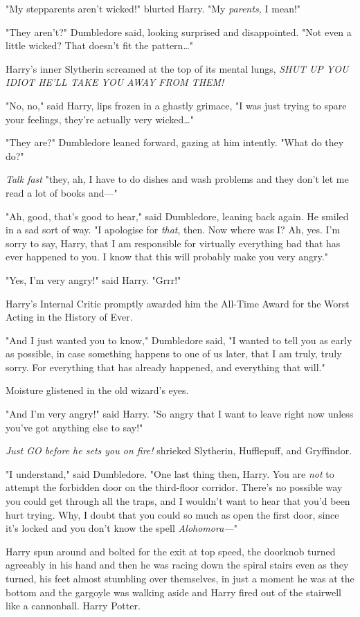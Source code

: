 "My stepparents aren’t wicked!" blurted Harry. "My \emph{parents,} I mean!"

"They aren’t?" Dumbledore said, looking surprised and disappointed. "Not even a
little wicked? That doesn’t fit the pattern…"

Harry’s inner Slytherin screamed at the top of its mental lungs, \emph{SHUT UP
YOU IDIOT HE’LL TAKE YOU AWAY FROM THEM!}

"No, no," said Harry, lips frozen in a ghastly grimace, "I was just trying to
spare your feelings, they’re actually very wicked…"

"They are?" Dumbledore leaned forward, gazing at him intently. "What do they
do?"

\emph{Talk fast} "they, ah, I have to do dishes and wash problems and they
don’t let me read a lot of books and—"

"Ah, good, that’s good to hear," said Dumbledore, leaning back again. He smiled
in a sad sort of way. "I apologise for \emph{that}, then. Now where was I? Ah,
yes. I’m sorry to say, Harry, that I am responsible for virtually everything
bad that has ever happened to you. I know that this will probably make you very
angry."

"Yes, I’m very angry!" said Harry. "Grrr!"

Harry’s Internal Critic promptly awarded him the All-Time Award for the Worst
Acting in the History of Ever.

"And I just wanted you to know," Dumbledore said, "I wanted to tell you as
early as possible, in case something happens to one of us later, that I am
truly, truly sorry. For everything that has already happened, and everything
that will."

Moisture glistened in the old wizard’s eyes.

"And I’m very angry!" said Harry. "So angry that I want to leave right now
unless you’ve got anything else to say!"

\emph{Just GO before he sets you on fire!} shrieked Slytherin, Hufflepuff, and
Gryffindor.

"I understand," said Dumbledore. "One last thing then, Harry. You are
\emph{not} to attempt the forbidden door on the third-floor corridor. There’s
no possible way you could get through all the traps, and I wouldn’t want to
hear that you’d been hurt trying. Why, I doubt that you could so much as open
the first door, since it’s locked and you don’t know the spell
\emph{Alohomora—}"

Harry spun around and bolted for the exit at top speed, the doorknob turned
agreeably in his hand and then he was racing down the spiral stairs even as
they turned, his feet almost stumbling over themselves, in just a moment he was
at the bottom and the gargoyle was walking aside and Harry fired out of the
stairwell like a cannonball.
\later
Harry Potter.

